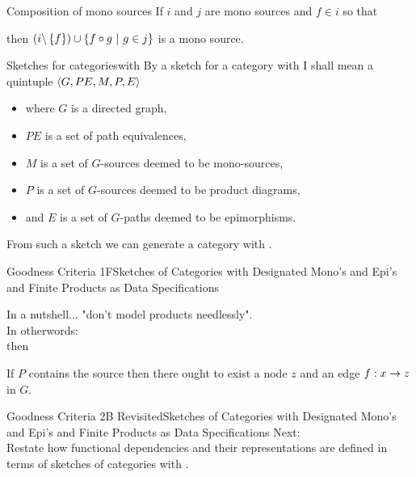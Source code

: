 

\renewcommand{\slidecontext}{Sketches of Categories with Designated Mono's and Epi's and Finite Products as Data Specifications}

\begin{frame}{Composition of mono sources}
If $i$ and $j$ are mono sources and $f \in i$ so that
\begin{center}
\scalebox{0.65}{

}
\end{center}
then $(i \backslash \left\{f\right\}) \cup \left\{f \circ g \ \middle|\ g \in j\right\}$ is a mono source.
\end{frame}

\begin{frame}{Sketches for categories}{with \thirdstructure }
By a sketch for a category with \thirdstructure I shall mean a quintuple
$\langle G,PE,M,P,E\rangle$
\begin{itemize}
\item  where $G$ is a directed graph, 
\item  $PE$ is a set of path equivalences, 
\item  $M$ is a set of $G$-sources deemed to be mono-sources,
\item  $P$ is a set of $G$-sources deemed to be product diagrams, 
\item  and $E$ is a set of $G$-paths deemed to be epimorphisms.
\end{itemize}
\medskip
From such a sketch we can generate a category with \thirdstructure.  
\end{frame}

\begin{frame}{Goodness Criteria 1F}{\slidecontext}

In  a nutshell... "don't model products needlessly".\\

\pause In otherwords:\\
\medskip
\IfSforproductepimonoCwithRCwords then

 If $P$ contains the source  
then there ought to exist a node $z$ and an edge $f: x \rightarrow z$ in $G$.
\end{frame}

\begin{frame}{Goodness Criteria 2B Revisited}{\slidecontext}
Next:\\
Restate how functional dependencies and their representations are defined in terms of sketches of categories with \thirdstructure.
\end{frame}

